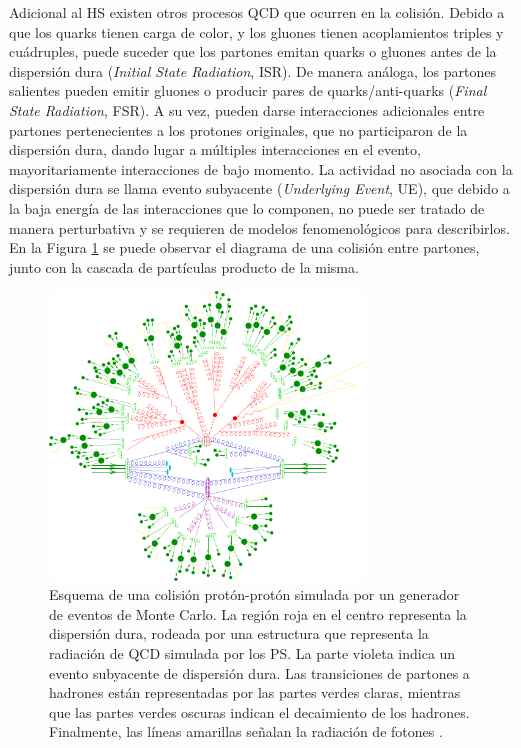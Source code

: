 Adicional al HS existen otros procesos QCD que ocurren en la colisión. Debido a que los quarks tienen carga de color, y los gluones tienen acoplamientos triples y cuádruples, puede suceder que los partones emitan quarks o gluones antes de la dispersión dura (\textit{Initial State Radiation}, ISR). De manera análoga, los partones salientes pueden emitir gluones o
producir pares de quarks/anti-quarks (\textit{Final State Radiation}, FSR). A su vez, pueden darse interacciones adicionales entre partones pertenecientes a los protones originales, que no participaron de la dispersión dura, dando lugar a múltiples
interacciones en el evento, mayoritariamente interacciones de bajo momento. La actividad no asociada con la dispersión dura se llama evento subyacente
(\textit{Underlying Event}, UE), que debido a la baja energía de las interacciones que lo
componen, no puede ser tratado de manera perturbativa y se requieren de modelos
fenomenológicos para describirlos. En la Figura \ref{fig:mc_qcd} se puede observar el diagrama de una colisión entre partones, junto con la cascada de partículas producto de la misma.

\begin{figure}[!ht]
  \centering
  \includegraphics[width=0.75\textwidth]{images/lhc/mc_qcd.pdf}
  \caption{Esquema de una colisión protón-protón simulada por un generador de
eventos de Monte Carlo. La región roja en el centro representa la dispersión dura,
rodeada por una estructura que representa la radiación de QCD
simulada por los PS. La parte violeta indica un evento subyacente 
de dispersión dura. Las transiciones de partones a hadrones están representadas
por las partes verdes claras, mientras que las partes verdes oscuras indican el 
decaimiento de los hadrones. Finalmente, las líneas amarillas señalan la radiación de
fotones \cite{mc_simulation}.}
\label{fig:mc_qcd}
\end{figure}

